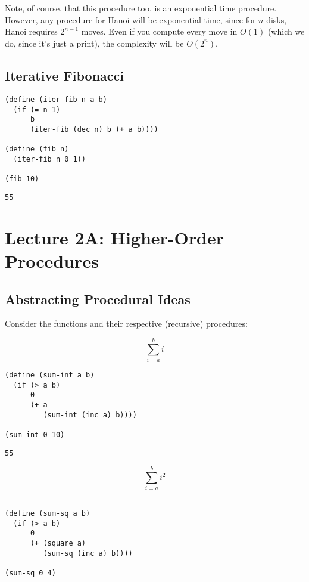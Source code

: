\documentclass[9pt]{report}
\begin{document}
Note, of course, that this procedure too, is an exponential time
procedure. However, any procedure for Hanoi will be exponential
time, since for \(n\) disks, Hanoi requires \(2^{n-1}\) moves. Even if
you compute every move in \(O(1)\) (which we do, since it's just a
print), the complexity will be \(O(2^n)\).

\section{Iterative Fibonacci}
\label{sec:org96310b6}

\begin{verbatim}
(define (iter-fib n a b)
  (if (= n 1)
      b
      (iter-fib (dec n) b (+ a b))))

(define (fib n)
  (iter-fib n 0 1))

(fib 10)
\end{verbatim}

\begin{verbatim}
55
\end{verbatim}

\chapter{Lecture 2A: Higher-Order Procedures}
\label{sec:orge3dd73d}

\section{Abstracting Procedural Ideas}
\label{sec:org486f815}

Consider the functions and their respective (recursive) procedures:

$$\sum_{i=a}^{b} i$$

\begin{verbatim}
(define (sum-int a b)
  (if (> a b)
      0
      (+ a
         (sum-int (inc a) b))))

(sum-int 0 10)
\end{verbatim}

\begin{verbatim}
55
\end{verbatim}


$$\sum_{i=a}^{b} i^{2}$$

\begin{verbatim}

(define (sum-sq a b)
  (if (> a b)
      0
      (+ (square a)
         (sum-sq (inc a) b))))

(sum-sq 0 4)
\end{verbatim}
\end{document}

